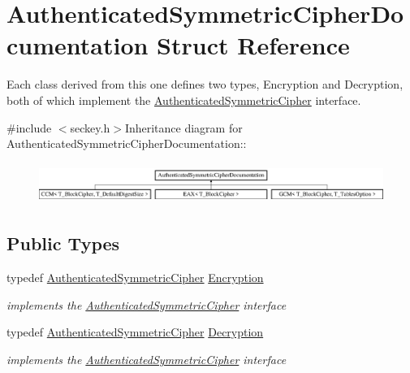\hypertarget{struct_authenticated_symmetric_cipher_documentation}{
\section{AuthenticatedSymmetricCipherDocumentation Struct Reference}
\label{struct_authenticated_symmetric_cipher_documentation}
}


Each class derived from this one defines two types, Encryption and Decryption, both of which implement the \hyperlink{class_authenticated_symmetric_cipher}{AuthenticatedSymmetricCipher} interface.  


{\ttfamily \#include $<$seckey.h$>$}Inheritance diagram for AuthenticatedSymmetricCipherDocumentation::\begin{figure}[H]
\begin{center}
\leavevmode
\includegraphics[height=1.34293cm]{struct_authenticated_symmetric_cipher_documentation}
\end{center}
\end{figure}
\subsection*{Public Types}
\begin{DoxyCompactItemize}
\item 
\hypertarget{struct_authenticated_symmetric_cipher_documentation_a67801ee56d330c2b74aa5fc3871ee6c8}{
typedef \hyperlink{class_authenticated_symmetric_cipher}{AuthenticatedSymmetricCipher} \hyperlink{struct_authenticated_symmetric_cipher_documentation_a67801ee56d330c2b74aa5fc3871ee6c8}{Encryption}}
\label{struct_authenticated_symmetric_cipher_documentation_a67801ee56d330c2b74aa5fc3871ee6c8}

\begin{DoxyCompactList}\small\item\em implements the \hyperlink{class_authenticated_symmetric_cipher}{AuthenticatedSymmetricCipher} interface \item\end{DoxyCompactList}\item 
\hypertarget{struct_authenticated_symmetric_cipher_documentation_a12f05149e95a3e831d5827d65847ea08}{
typedef \hyperlink{class_authenticated_symmetric_cipher}{AuthenticatedSymmetricCipher} \hyperlink{struct_authenticated_symmetric_cipher_documentation_a12f05149e95a3e831d5827d65847ea08}{Decryption}}
\label{struct_authenticated_symmetric_cipher_documentation_a12f05149e95a3e831d5827d65847ea08}

\begin{DoxyCompactList}\small\item\em implements the \hyperlink{class_authenticated_symmetric_cipher}{AuthenticatedSymmetricCipher} interface \item\end{DoxyCompactList}\end{DoxyCompactItemize}


